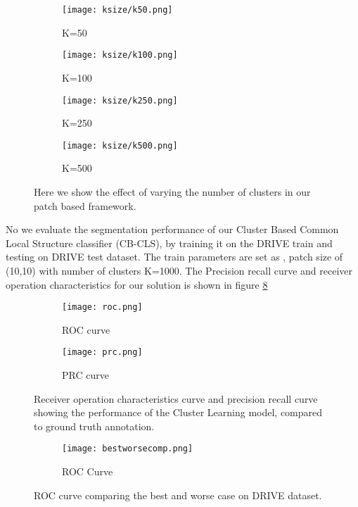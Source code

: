 \begin{figure}
	\begin{subfigure}[b]{0.45\textwidth}
		\texttt{[image: ksize/k50.png]}
		\caption{K=50}
		\label{fig:k50}
	\end{subfigure}
	\begin{subfigure}[b]{0.45\textwidth}
		\texttt{[image: ksize/k100.png]}
		\caption{K=100}
		\label{fig:k100}
	\end{subfigure}
	
	\begin{subfigure}[b]{0.45\textwidth}
		\texttt{[image: ksize/k250.png]}
		\caption{K=250}
		\label{fig:k250}
	\end{subfigure}
	\begin{subfigure}[b]{0.45\textwidth}
		\texttt{[image: ksize/k500.png]}
		\caption{K=500}
		\label{fig:k500}
	\end{subfigure}
	\caption[Image segmentation using varying the number of clusters]{Here we show the effect of varying the number of clusters in our patch based framework.}
	\label{fig:ksize}
\end{figure}

No we evaluate the segmentation performance of our Cluster Based Common Local Structure classifier (CB-CLS), by training it on the DRIVE train and testing on DRIVE test dataset. The train parameters are set as , patch size of (10,10) with number of clusters K=1000.
The Precision recall curve and receiver operation characteristics for our solution is shown in figure \ref{fig:rocprc}\\

\begin{figure}
	\centering
	\begin{subfigure}[b]{0.45\textwidth}
		\texttt{[image: roc.png]}
		\caption{ROC curve}
		\label{fig:roc}
	\end{subfigure}
	\begin{subfigure}[b]{0.45\textwidth}
		\texttt{[image: prc.png]}
		\caption{PRC curve}
		\label{fig:prc}
	\end{subfigure}
	\caption[ROC and PRC curve for Cluster Learning based model]{Receiver operation characteristics curve and precision recall curve showing the performance of the Cluster Learning model, compared to ground truth annotation.}
	\label{fig:rocprc}
\end{figure}
\begin{figure}
	\centering
	
	\begin{subfigure}[b]{0.75\textwidth}
		\texttt{[image: bestworsecomp.png]}
		\caption{ROC Curve}
		\label{fig:bestworse}
	\end{subfigure}
	\caption[ROC curve comparing the best and worse case on DRIVE setl]{ROC curve comparing the best and worse case on DRIVE dataset.}
	\label{fig:bestroc}
\end{figure}

